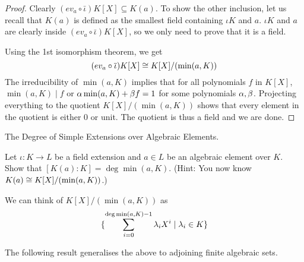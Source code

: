 \documentclass[../book.tex]{subfiles}
\begin{document}
\begin{proof}
    Clearly $(ev_a\circ\bar\iota) K[X] \subseteq K(a)$.
    To show the other inclusion, let us recall that
    $K(a)$ is defined as the smallest field containing $\iota K$ and $a$.
    $\iota K$ and $a$ are clearly inside $(ev_a\circ\bar\iota) K[X]$,
    so we only need to prove that it is a field.
    
    Using the 1st isomorphism theorem, we get \[
        (ev_a\circ\overline{\iota}) K[X] \cong K[X]/(\min(a,K))
    \]
    The irreducibility of $\min(a,K)$ implies that 
    for all polynomials $f$ in $K[X]$, $\min(a,K) \mid f$ or 
    $\alpha \min(a,K) + \beta f = 1$ for some polynomials $\alpha, \beta$.
    Projecting everything to the quotient $K[X]/(\min(a,K))$ shows that
    every element in the quotient is either 0 or unit.
    The quotient is thus a field and we are done. 
\end{proof}
\begin{ex} The Degree of Simple Extensions over Algebraic Elements.

    Let $\iota : K \to L$ be a field extension and 
    $a \in L$ be an algebraic element over $K$. 
    Show that $[K(a):K] = \deg \min(a, K)$. 
    (Hint: You now know $K(a) \cong K[X]/(\min(a,K))$.)
\end{ex}
\begin{rmk}
    We can think of $K[X]/(\min(a,K))$ as 
    \[\displaystyle 
        \{\sum_{i=0}^{\deg\min(a,K) - 1} \lambda_i X^i \mid \lambda_i \in K\}
    \]
\end{rmk}

The following result generalises the above to adjoining finite algebraic sets.
\end{document}
